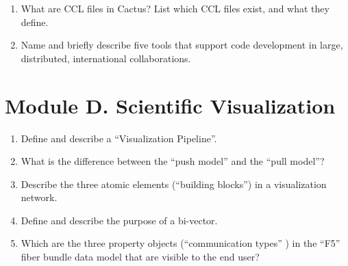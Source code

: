 \documentclass[oneside]{article}
\newcommand{\answerspace}{\vskip 6.5cm}
\newcommand{\answer}[1]{}
\begin{document}
\begin{enumerate}
\answerspace

 \item What are CCL files in Cactus? List which CCL files exist, and
   what they define.
\answer{
CCL files declare the interface of a Cactus component (thorn) to the
Cactus framework (flesh). There are three kinds of CCL files:
- interface.ccl: define thorn inheritance structure and grid functions
- schedule.ccl:  specify when routines are called and storage is allocated
- param.ccl:     declare the thorn's run-time parameters
}

\answerspace

 \item Name and briefly describe five tools that support code development in large,
   distributed, international collaborations.
\answer{
- email
- chat (AIM, Skype)
- repositories (cvs, svn, git)
- wikis
- bug trackers
- telephone conferencing
- video conferencing (Skype, EVO)
- Google docs (live editing)
}
      
 \end{enumerate}

\newpage

\section*{\center Module D. Scientific Visualization}

\begin{enumerate}
  \item Define and describe a ``Visualization Pipeline''.
\answerspace

  \item What is the difference between the ``push model'' and the ``pull model''?
\answerspace

  \item Describe the three atomic elements (``building blocks'') in a visualization network.
\answerspace

  \item Define and describe the purpose of a bi-vector.
\answerspace

  \item Which are the three property objects (``communication types'' ) in the ``F5'' fiber bundle data model that are visible to the end user?

 \end{enumerate}
\end{document}
